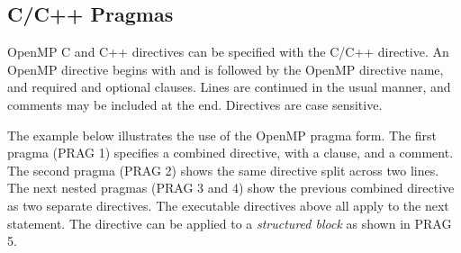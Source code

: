 \begin{ccppspecific}[4ex]
\section{C/C++ Pragmas}
\label{sec:pragmas}

OpenMP C and C++ directives can be specified with the C/C++  directive.
An OpenMP directive begins with  and is followed by the 
OpenMP directive name, and required and optional clauses. Lines are continued in the 
usual manner, and comments may be included at the end.
Directives are case sensitive.

The example below illustrates the use of the OpenMP pragma form.
The first pragma (PRAG 1) specifies a combined  
directive, with a  clause, and a comment. 
The second pragma (PRAG 2) shows the same directive split
across two lines. The next nested pragmas (PRAG 3 and 4) show the previous combined directive as 
two separate directives. The executable directives above all apply to the next 
statement. The  directive can be applied to a \emph{structured block}
as shown in PRAG 5.

\pagebreak
{}
\end{ccppspecific}
